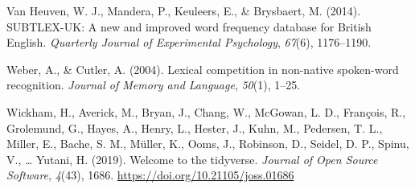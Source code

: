 \documentclass[
]{article}
\newlength{\cslhangindent}
\newenvironment{CSLReferences}[2] %
 {\begin{list}{}{%
  \setlength{\itemindent}{0pt}
  \setlength{\leftmargin}{0pt}
  \setlength{\parsep}{0pt}
  \ifodd #1
   \setlength{\leftmargin}{\cslhangindent}
   \setlength{\itemindent}{-1\cslhangindent}
  \fi
  \setlength{\itemsep}{#2\baselineskip}}}
 {\end{list}}
\begin{document}
\begin{CSLReferences}{1}{0}
Van Heuven, W. J., Mandera, P., Keuleers, E., \& Brysbaert, M. (2014).
{SUBTLEX-UK}: {A} new and improved word frequency database for {British
English}. \emph{Quarterly Journal of Experimental Psychology},
\emph{67}(6), 1176--1190.

Weber, A., \& Cutler, A. (2004). Lexical competition in non-native
spoken-word recognition. \emph{Journal of Memory and Language},
\emph{50}(1), 1--25.

Wickham, H., Averick, M., Bryan, J., Chang, W., McGowan, L. D.,
François, R., Grolemund, G., Hayes, A., Henry, L., Hester, J., Kuhn, M.,
Pedersen, T. L., Miller, E., Bache, S. M., Müller, K., Ooms, J.,
Robinson, D., Seidel, D. P., Spinu, V., \ldots{} Yutani, H. (2019).
Welcome to the tidyverse. \emph{Journal of Open Source Software},
\emph{4}(43), 1686. \url{https://doi.org/10.21105/joss.01686}

\end{CSLReferences}
\end{document}

